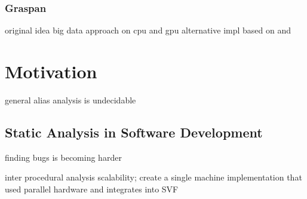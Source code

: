 \subsubsection{Graspan}
original idea \autocite{zheng2008demand} big data approach on cpu \autocite{wang2017graspan} and gpu \autocite{zuo2021systemizing} alternative impl \autocite{gu2020towards} based on \autocite{mendez2012gpu} and \autocite{mendez2010parallel}
\section{Motivation}
general alias analysis is undecidable
\subsection{Static Analysis in Software Development}
finding bugs is becoming harder

inter procedural analysis scalability; create a single machine implementation that used parallel hardware and integrates into SVF
